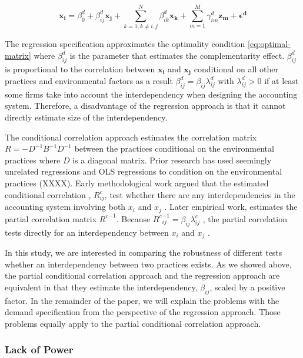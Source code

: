 \documentclass[12pt]{article}
\begin{document}
\begin{equation} \label{eq:demand-specification}
\mathbf{x_i} = \beta_0^d + \beta_{ij}^d \mathbf{x_j} 
		+ \sum_{k = 1, k \neq i,j}^N \beta_{ik}^d \mathbf{x_k} 
        + \sum_{m = 1}^M \gamma_{im}^d \mathbf{z_m}
        + \mathbf{\epsilon^d}
\end{equation}

The regression specification approximates the optimality condition  \eqref{eq:optimal-matrix} where \(\beta^d_{ij}\) is the parameter that estimates the complementarity effect. $\beta_{ij}^d$ is proportional to the  correlation between $\mathbf{x_i}$ and $\mathbf{x_j}$ conditional on all other practices and environmental factors as a result  $\beta^d_{ij} = \beta_{ij} \lambda^d_{ij}$ with $\lambda^d_{ij} > 0$ if at least some firms take into account the interdependency when designing the accounting system. Therefore, a disadvantage of the regression approach is that it cannot directly estimate size of the interdependency.

The conditional correlation approach estimates the correlation matrix $R = -D^{-1}B^{-1}D^{-1}$ between the practices  conditional on the environmental practices where $D$ is a diagonal matrix. Prior research has used seemingly unrelated regressions and OLS regressions to condition on the environmental practices (XXXX). Early methodological work argued that the estimated conditional correlation , $R^c_{ij}$, test whether there are any interdependencies in the accounting system involving both $x_i$ and $x_j$ \citep{Arora1996}.  Later empirical work, estimates the partial correlation matrix ${R^c}^{-1}$. Because ${R^c}^{-1}_{ij} = \beta_{ij} \lambda^c_{ij}$ , the partial correlation tests directly for an interdependency between $x_i$ and $x_j$ \citep{Indjejikian2012}. 

In this study, we are interested in comparing the robustness of different tests whether an interdependency between two practices exists. As we showed above, the partial conditional correlation approach and the regression approach are equivalent in that they estimate the interdependency, $\beta_{ij}$, scaled by a positive factor. In the remainder of the paper, we will explain the problems with the demand specification from the perspective of the regression approach. Those problems equally apply to the partial conditional correlation approach.  

\subsubsection{Lack of Power}
\end{document}
